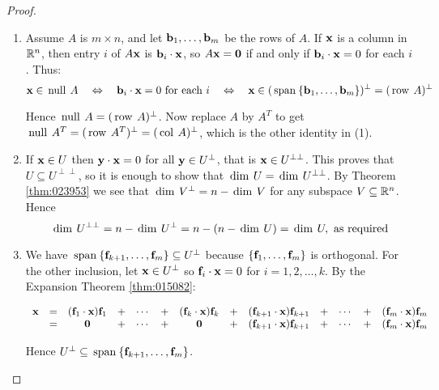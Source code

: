 \begin{proof}
\begin{enumerate}
\item Assume $A$ is $m\times n$, and let $\textbf{b}_{1},\ldots ,\textbf{b}_{m}$ be the rows of $A$. If $\textbf{x}$ is a column
in $\mathbb{R}^{n}$, then entry $i$ of $A\textbf{x}$ is $\textbf{b}_{i}\cdot \textbf{x}$, so $A\textbf{x}=\textbf{0}$ if and only if $\textbf{b}_{i}\cdot \textbf{x}=0$ for each $i$. Thus:
\begin{equation*}
\textbf{x}\in \thinspace\operatorname{null\medspace}A \quad \Leftrightarrow \quad \textbf{b}_{i}\cdot \textbf{x}=0 \mbox{ for each } i \quad \Leftrightarrow \quad \textbf{x}\in (\thinspace\operatorname{span\medspace}\{\textbf{b}_{1},\ldots,\textbf{b}_{m}\})^{\perp}=(\thinspace\operatorname{row\medspace}A)^{\perp}
\end{equation*}

\noindent Hence $\thinspace\operatorname{null\medspace}A=(\thinspace\operatorname{row\medspace}A)^{\perp}$. Now replace $A$
by $A^{T}$ to get $\thinspace\operatorname{null\medspace}A^{T}=(\thinspace\operatorname{row\medspace}A^{T})^{\perp}=(\thinspace\operatorname{col\medspace}A)^{\perp}$, which is the other identity in (1).

\item If $\textbf{x}\in U$ then $\textbf{y}\cdot \textbf{x}=0$ for all $\textbf{y}\in U^{\perp}$, that is $\textbf{x}\in U^{\perp\perp}$. This proves that $U\subseteq U^{\perp\perp}$, so it is enough to show that $\thinspace\operatorname{dim\medspace}U=\thinspace\operatorname{dim\medspace}U^{\perp\perp}$. By Theorem \ref{thm:023953} we see that $\thinspace\operatorname{dim\medspace}V^{\perp}=n-\thinspace\operatorname{dim\medspace}V$ for any subspace $V\subseteq \mathbb{R}^{n}$. Hence 
\begin{equation*}
\thinspace\operatorname{dim\medspace}U^{\perp\perp}=n-\thinspace\operatorname{dim\medspace}U^{\perp}=n-(n-\thinspace\operatorname{dim\medspace}U)=\thinspace\operatorname{dim\medspace}U, \mbox{ as required}
\end{equation*}

\item We have $\thinspace\operatorname{span\medspace}\{\textbf{f}_{k+1},\ldots ,\textbf{f}_{m}\}\subseteq U^{\perp}$ because $\{\textbf{f}_{1},\ldots ,\textbf{f}_{m}\} $ is orthogonal. For the other inclusion, let $\textbf{x}\in U^{\perp} $ so $\textbf{f}_{i}\cdot \textbf{x}=0$ for $i=1,2,\ldots ,k$. By the
Expansion Theorem \ref{thm:015082}: 

\begin{equation*}
\begin{array}{ccccccccccccc}
\textbf{x} & =  & (\textbf{f}_{1}\cdot \textbf{x})\textbf{f}_{1} & + & \cdots & + & (\textbf{f}_{k}\cdot \textbf{x})\textbf{f}_{k} & + &(\textbf{f}_{k+1}\cdot \textbf{x})\textbf{f}_{k+1} & + &\cdots &+&(\textbf{f}_{m}\cdot \textbf{x})\textbf{f}_{m} \\ 
& =  & \textbf{0} &+ &\cdots  &+ &\textbf{0} &+ &(\textbf{f}_{k+1}\cdot \textbf{x})\textbf{f}_{k+1}& + &\cdots &+&(\textbf{f}_{m}\cdot \textbf{x})\textbf{f}_{m}
\end{array}
\end{equation*} 

\noindent Hence $U^{\perp}\subseteq \thinspace\operatorname{span\medspace}\{\textbf{f}_{k+1},\ldots ,\textbf{f}_{m}\}$.
\end{enumerate}
\end{proof}

